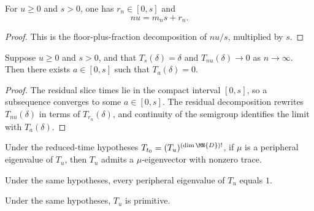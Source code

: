 \begin{theorem}
    \label{thm:residual_slice_decomp_ch12}
    \leanok
    For $u \ge 0$ and $s > 0$, one has $r_n \in [0,s]$ and
    \[
        nu = m_n s + r_n.
    \]
\end{theorem}

\begin{proof}
    \leanok
    This is the floor-plus-fraction decomposition of $nu/s$, multiplied by $s$.
\end{proof}

\begin{theorem}
    \label{thm:exists_residual_time_eq_zero_ch12}
    \leanok
    Suppose $u \ge 0$ and $s > 0$, and that $T_s(\delta)=\delta$ and
    $T_{nu}(\delta) \to 0$ as $n \to \infty$.
    Then there exists $a \in [0,s]$ such that $T_a(\delta)=0$.
\end{theorem}

\begin{proof}
    \leanok
    The residual slice times lie in the compact interval $[0,s]$, so a subsequence converges
    to some $a \in [0,s]$. The residual decomposition rewrites $T_{nu}(\delta)$ in terms of
    $T_{r_n}(\delta)$, and continuity of the semigroup identifies the limit with $T_a(\delta)$.
\end{proof}

\begin{theorem}
    \label{thm:exists_trace_ne_zero_eigenvector_of_fraction_slice_ch12}
    \leanok
    Under the reduced-time hypotheses
    $T_{t_0} = (T_u)^{(\dim \MN{D})!}$, if
    $\mu$ is a peripheral eigenvalue of $T_u$, then $T_u$ admits a
    $\mu$-eigenvector with nonzero trace.
\end{theorem}

\begin{theorem}
    \label{thm:peripheral_eq_one_of_fraction_slice_ch12}
    \leanok
    Under the same hypotheses, every peripheral eigenvalue of $T_u$
    equals $1$.
\end{theorem}

\begin{theorem}
    \label{thm:primitive_of_fraction_slice_ch12}
    \leanok
    Under the same hypotheses, $T_u$ is primitive.
\end{theorem}

